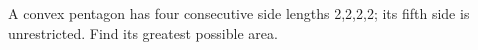 A convex pentagon has four consecutive side lengths 2,2,2,2; its fifth side is unrestricted. Find its greatest possible area.
